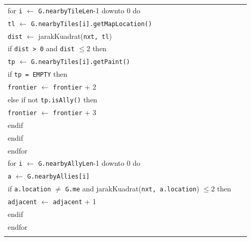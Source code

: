 \documentclass{article}
\newenvironment{pseudobox}
{
\centering
\begin{longtable}{|p{0.94\linewidth}|}
\hline
}
{
\\ \hline
\end{longtable}
\vspace{0.05cm}
}
\begin{document}
\begin{enumerate}[label=\alph*.]
\begin{enumerate}[label=\alph*.]
\begin{pseudobox}
\hspace*{1.5em}for \texttt{i} $\leftarrow$ \texttt{G.nearbyTileLen}-1 downto 0 do \\
\hspace*{3em}\texttt{tl} $\leftarrow$ \texttt{G.nearbyTiles[i].getMapLocation()} \\
\hspace*{3em}\texttt{dist} $\leftarrow$ jarakKuadrat(\texttt{nxt, tl}) \\
\hspace*{3em}if \texttt{dist > 0} and \texttt{dist} $\leq 2$ then \\
\hspace*{4.5em}\texttt{tp} $\leftarrow$ \texttt{G.nearbyTiles[i].getPaint()} \\
\hspace*{4.5em}if \texttt{tp = EMPTY} then \\
\hspace*{6em}\texttt{frontier} $\leftarrow$ \texttt{frontier} + 2 \\
\hspace*{4.5em}else if not \texttt{tp.isAlly()} then \\
\hspace*{6em}\texttt{frontier} $\leftarrow$ \texttt{frontier} + 3 \\
\hspace*{4.5em}endif \\
\hspace*{3em}endif \\
\hspace*{1.5em}endfor \\

\hspace*{1.5em}for \texttt{i} $\leftarrow$ \texttt{G.nearbyAllyLen}-1 downto 0 do \\
\hspace*{3em}\texttt{a} $\leftarrow$ \texttt{G.nearbyAllies[i]} \\
\hspace*{3em}if \texttt{a.location} $\neq$ \texttt{G.me} and jarakKuadrat(\texttt{nxt, a.location}) $\leq 2$ then \\
\hspace*{4.5em}\texttt{adjacent} $\leftarrow$ \texttt{adjacent} + 1 \\
\hspace*{3em}endif \\
\hspace*{1.5em}endfor \\


\end{pseudobox}
\end{enumerate}
\end{enumerate}
\end{document}
